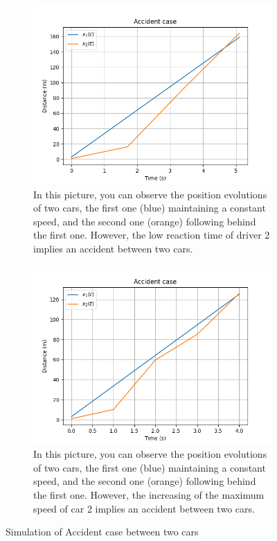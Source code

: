 \documentclass{article}
\begin{document}
\begin{figure}[H]
\begin{subfigure}[b]{0.45\textwidth}
			\includegraphics[width=\textwidth]{1W2_Acc2.png}
			\caption{In this picture, you can observe the position evolutions of two cars, the first one (blue) maintaining a constant speed, and the second one (orange) following behind the first one. However, the low reaction time of driver 2 implies an accident between two cars.}
			\label{fig:sub2}
		\end{subfigure}
		
		\vspace{1cm}
		
		\begin{subfigure}[b]{0.7\textwidth}
			\centering
			\includegraphics[width=\textwidth]{1W2_Acc3.png}
			\caption{In this picture, you can observe the position evolutions of two cars, the first one (blue) maintaining a constant speed, and the second one (orange) following behind the first one. However, the increasing of the maximum speed of car 2 implies an accident between two cars.}
			\label{fig:sub3}
		\end{subfigure}
		\caption{Simulation of Accident case between two cars}
		\label{fig:accident_simulation}
	\end{figure}
	
	\newpage
	
	\printbibliography
\end{document}
